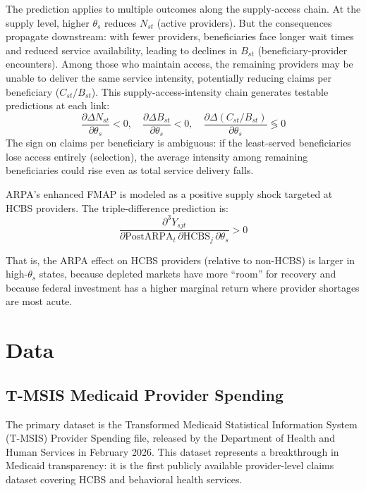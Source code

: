 \documentclass[12pt]{article}
\begin{document}
The prediction applies to multiple outcomes along the supply-access chain. At the supply level, higher $\theta_s$ reduces $N_{st}$ (active providers). But the consequences propagate downstream: with fewer providers, beneficiaries face longer wait times and reduced service availability, leading to declines in $B_{st}$ (beneficiary-provider encounters). Among those who maintain access, the remaining providers may be unable to deliver the same service intensity, potentially reducing claims per beneficiary ($C_{st}/B_{st}$). This supply-access-intensity chain generates testable predictions at each link:
\begin{equation}
\frac{\partial \Delta N_{st}}{\partial \theta_s} < 0, \quad \frac{\partial \Delta B_{st}}{\partial \theta_s} < 0, \quad \frac{\partial \Delta (C_{st}/B_{st})}{\partial \theta_s} \lessgtr 0
\end{equation}
The sign on claims per beneficiary is ambiguous: if the least-served beneficiaries lose access entirely (selection), the average intensity among remaining beneficiaries could rise even as total service delivery falls.

ARPA's enhanced FMAP is modeled as a positive supply shock targeted at HCBS providers. The triple-difference prediction is:
\begin{equation}
\frac{\partial^3 Y_{sjt}}{\partial \text{PostARPA}_t \, \partial \text{HCBS}_j \, \partial \theta_s} > 0
\end{equation}

That is, the ARPA effect on HCBS providers (relative to non-HCBS) is larger in high-$\theta_s$ states, because depleted markets have more ``room'' for recovery and because federal investment has a higher marginal return where provider shortages are most acute.


\section{Data}

\subsection{T-MSIS Medicaid Provider Spending}

The primary dataset is the Transformed Medicaid Statistical Information System (T-MSIS) Provider Spending file, released by the Department of Health and Human Services in February 2026. This dataset represents a breakthrough in Medicaid transparency: it is the first publicly available provider-level claims dataset covering HCBS and behavioral health services.
\end{document}
